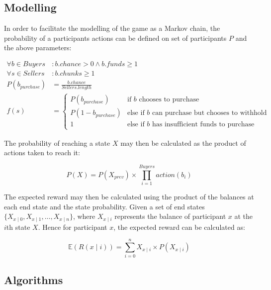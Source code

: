 \subsection{Modelling}

In order to facilitate the modelling of the game as a Markov chain, the probability of a participants actions can be defined on set of participants $P$ and the above parameters:

\begin{align} \label{equation:participantactions}
    \forall b \in Buyers &: b.chance > 0 \land b.funds \geq 1 \\
    \forall s \in Sellers &: b.chunks \geq 1 \\
    P(b_{purchase}) &= \frac{b.chance}{Sellers.length} \label{equation:probabilitypurchase}\\
    f(s) &= \label{equation:participantactionsend}
        \begin{cases}
            P(b_{purchase})     & \text{if $b$ chooses to purchase} \\
            P(1 - b_{purchase}) & \text{else if $b$ can purchase but chooses to withhold} \\
            1                   & \text{else if $b$ has insufficient funds to purchase}
        \end{cases}
\end{align}

The probability of reaching a state $X$ may then be calculated as the product of actions taken to reach it:

\begin{equation}
    P(X) = P(X_{prev}) \times \prod_{i=1}^{Buyers} action(b_i) \label{equation:stateprobability}
\end{equation}

The expected reward may then be calculated using the product of the balances at each end state and the state probability. Given a set of end states $\{X_{x \mid 0}, X_{x \mid 1}, \ldots, X_{x \mid n}\}$, where $X_{x \mid i}$ represents the balance of participant $x$ at the $i$th state $X$. Hence for participant $x$, the expected reward can be calculated as:

\begin{equation} \label{algorithm:state-expected-reward}
    \mathbb{E}(R(x \mid i)) = \sum_{i = 0}^n X_{x \mid i} \times P(X_{x \mid i})
\end{equation}

\subsection{Algorithms}

